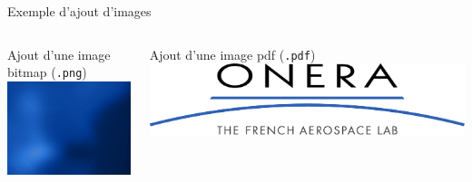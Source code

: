 \documentclass[compress,10pt,aspectratio=169]{beamer}
\begin{document}
\begin{frame}[t]{Exemple d'ajout d'images}
\begin{columns}[t]
    \begin{column}{0.5\textwidth}
        \centering
        Ajout d'une image bitmap (\texttt{.png})\\\vspace{10pt}
	\includegraphics[width=0.75\textheight]{./figbeameronera/fond-onera-plein-43_small.png}
    \end{column}
    \begin{column}{0.5\textwidth}
        \centering
        Ajout d'une image pdf (\texttt{.pdf})\\\vspace{10pt}
        \includegraphics[width=1\textwidth]{./figbeameronera/logo-onera-ident-pantone660-HD.pdf}
    \end{column}
\end{columns}
\end{frame}



\end{document}
